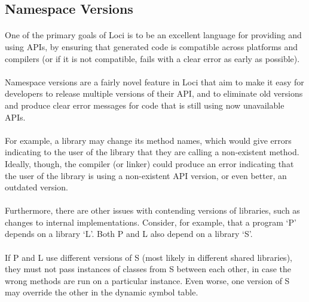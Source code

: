 \documentclass[12pt,twoside,notitlepage]{report}
\begin{document}
\clearpage

\subsection{Namespace Versions}

\paragraph{}
One of the primary goals of Loci is to be an excellent language for providing and using APIs, by ensuring that generated code is compatible across platforms and compilers (or if it is not compatible, fails with a clear error as early as possible).

\paragraph{}
Namespace versions are a fairly novel feature in Loci that aim to make it easy for developers to release multiple versions of their API, and to eliminate old versions and produce clear error messages for code that is still using now unavailable APIs.

\paragraph{}
For example, a library may change its method names, which would give errors indicating to the user of the library that they are calling a non-existent method. Ideally, though, the compiler (or linker) could produce an error indicating that the user of the library is using a non-existent API version, or even better, an outdated version.

\paragraph{}
Furthermore, there are other issues with contending versions of libraries, such as changes to internal implementations. Consider, for example, that a program `P' depends on a library `L'. Both P and L also depend on a library `S'.

\paragraph{}
If P and L use different versions of S (most likely in different shared libraries), they must not pass instances of classes from S between each other, in case the wrong methods are run on a particular instance. Even worse, one version of S may override the other in the dynamic symbol table.
\end{document}
